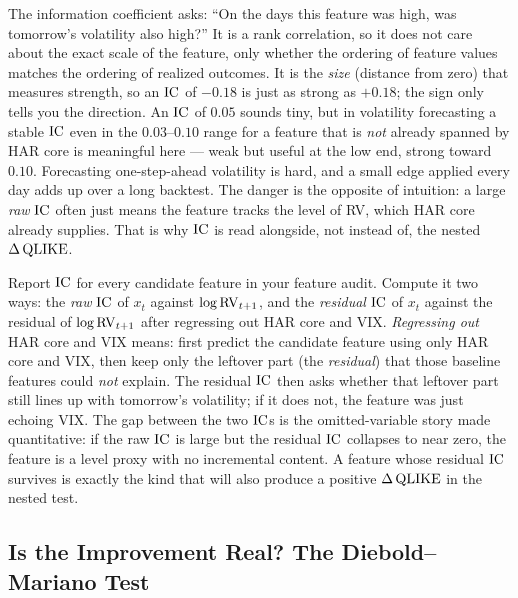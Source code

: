 \begin{intuition}
The information coefficient asks: ``On the days this feature was high, was tomorrow's volatility also high?'' It is a rank correlation, so it does not care about the exact scale of the feature, only whether the ordering of feature values matches the ordering of realized outcomes. It is the \emph{size} (distance from zero) that measures strength, so an $\operatorname{IC}$ of $-0.18$ is just as strong as $+0.18$; the sign only tells you the direction. An $\operatorname{IC}$ of $0.05$ sounds tiny, but in volatility forecasting a stable $\operatorname{IC}$ even in the $0.03$--$0.10$ range for a feature that is \emph{not} already spanned by HAR core is meaningful here --- weak but useful at the low end, strong toward $0.10$. Forecasting one-step-ahead volatility is hard, and a small edge applied every day adds up over a long backtest. The danger is the opposite of intuition: a large \emph{raw} $\operatorname{IC}$ often just means the feature tracks the level of RV, which HAR core already supplies. That is why $\operatorname{IC}$ is read alongside, not instead of, the nested $\Delta\operatorname{QLIKE}$.
\end{intuition}

\begin{projectconnection}
Report $\operatorname{IC}$ for every candidate feature in your feature audit. Compute it two ways: the \emph{raw} $\operatorname{IC}$ of $x_t$ against $\log\operatorname{RV}_{t+1}$, and the \emph{residual} $\operatorname{IC}$ of $x_t$ against the residual of $\log\operatorname{RV}_{t+1}$ after regressing out HAR core and VIX. \emph{Regressing out} HAR core and VIX means: first predict the candidate feature using only HAR core and VIX, then keep only the leftover part (the \emph{residual}) that those baseline features could \emph{not} explain. The residual $\operatorname{IC}$ then asks whether that leftover part still lines up with tomorrow's volatility; if it does not, the feature was just echoing VIX. The gap between the two $\operatorname{IC}$s is the omitted-variable story made quantitative: if the raw $\operatorname{IC}$ is large but the residual $\operatorname{IC}$ collapses to near zero, the feature is a level proxy with no incremental content. A feature whose residual $\operatorname{IC}$ survives is exactly the kind that will also produce a positive $\Delta\operatorname{QLIKE}$ in the nested test.
\end{projectconnection}

\subsection{Is the Improvement Real? The Diebold--Mariano Test}\label{sec:feat-incremental-dm}

